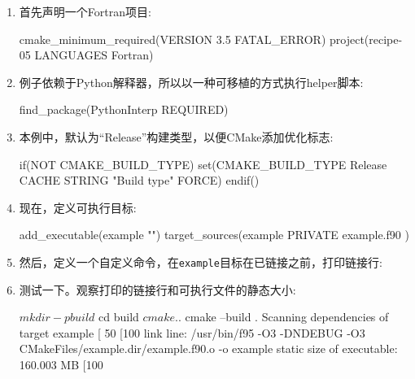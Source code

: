 \begin{enumerate}
\item 首先声明一个Fortran项目:

\begin{codebox}[cmake]
cmake_minimum_required(VERSION 3.5 FATAL_ERROR)
project(recipe-05 LANGUAGES Fortran)
\end{codebox}

\item 例子依赖于Python解释器，所以以一种可移植的方式执行helper脚本:

\begin{codebox}[cmake]
find_package(PythonInterp REQUIRED)
\end{codebox}

\item 本例中，默认为“Release”构建类型，以便CMake添加优化标志:

\begin{codebox}[cmake]
if(NOT CMAKE_BUILD_TYPE)
    set(CMAKE_BUILD_TYPE Release CACHE STRING "Build type" FORCE)
endif()
\end{codebox}

\item 现在，定义可执行目标:

\begin{codebox}[cmake]
add_executable(example "")
target_sources(example
  PRIVATE
    example.f90
  )
\end{codebox}

\item 然后，定义一个自定义命令，在\texttt{example}目标在已链接之前，打印链接行:


\item 测试一下。观察打印的链接行和可执行文件的静态大小:

\begin{codebox}[shell]
$ mkdir -p build
$ cd build
$ cmake ..
$ cmake --build .
Scanning dependencies of target example
[ 50%
[100%
link line:
/usr/bin/f95 -O3 -DNDEBUG -O3 CMakeFiles/example.dir/example.f90.o -o example
static size of executable:
160.003 MB
[100%
\end{codebox}

\end{enumerate}

